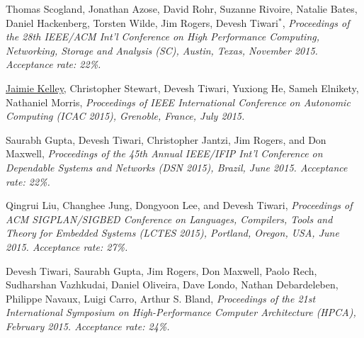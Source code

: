 {\textnormal{\newline Thomas Scogland, Jonathan Azose, David Rohr, Suzanne Rivoire, Natalie Bates, Daniel Hackenberg, Torsten Wilde, Jim Rogers, Devesh Tiwari$^*$,}} {\textit{Proceedings of the 28th IEEE/ACM Int'l Conference on High Performance Computing, Networking, Storage and Analysis (SC), Austin, Texas, November 2015. Acceptance rate: 22\%.}}{\textit{\color{black!90}{$^*$Listed as a co-author, but not included in the paper meta-data due to the PC member author limit.\newline}}}{}{} %

{\textnormal{\newline \underline{Jaimie Kelley}, Christopher Stewart, Devesh Tiwari, Yuxiong He, Sameh Elnikety, Nathaniel Morris,}} {\textit{Proceedings of IEEE International Conference on Autonomic Computing (ICAC 2015), Grenoble, France, July 2015.\newline}}{}{}{} %


{\textnormal{\newline Saurabh Gupta, Devesh Tiwari, Christopher Jantzi, Jim Rogers, and Don Maxwell,}} {\textit{Proceedings of the 45th Annual IEEE/IFIP Int’l Conference on Dependable Systems and Networks (DSN 2015), Brazil, June 2015. Acceptance rate: 22\%.\newline}}{}{}{} %

{\textnormal{\newline Qingrui Liu, Changhee Jung, Dongyoon Lee, and Devesh Tiwari,}} {\textit{Proceedings of ACM SIGPLAN/SIGBED Conference on 
Languages, Compilers, Tools and Theory for Embedded Systems (LCTES 2015), Portland, Oregon, USA, June 2015. Acceptance rate: 27\%.\newline}}{}{}{} %

{\textnormal{\newline Devesh Tiwari, Saurabh Gupta, Jim Rogers, Don Maxwell, Paolo Rech, Sudharshan Vazhkudai, Daniel Oliveira,  Dave Londo, Nathan Debardeleben, Philippe Navaux, Luigi Carro, Arthur S. Bland,}} {\textit{Proceedings of the 21st International Symposium on High-Performance Computer Architecture (HPCA), February 2015. Acceptance rate: 24\%.\newline}}{}{}{} %

